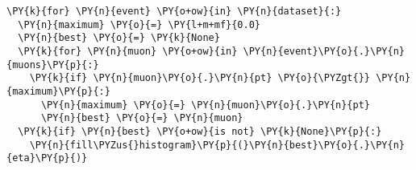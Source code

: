 \begin{Verbatim}[commandchars=\\\{\}]
\PY{k}{for} \PY{n}{event} \PY{o+ow}{in} \PY{n}{dataset}{:}
  \PY{n}{maximum} \PY{o}{=} \PY{l+m+mf}{0.0}
  \PY{n}{best} \PY{o}{=} \PY{k}{None}
  \PY{k}{for} \PY{n}{muon} \PY{o+ow}{in} \PY{n}{event}\PY{o}{.}\PY{n}{muons}\PY{p}{:}
    \PY{k}{if} \PY{n}{muon}\PY{o}{.}\PY{n}{pt} \PY{o}{\PYZgt{}} \PY{n}{maximum}\PY{p}{:}
      \PY{n}{maximum} \PY{o}{=} \PY{n}{muon}\PY{o}{.}\PY{n}{pt}
      \PY{n}{best} \PY{o}{=} \PY{n}{muon}
  \PY{k}{if} \PY{n}{best} \PY{o+ow}{is not} \PY{k}{None}\PY{p}{:}
    \PY{n}{fill\PYZus{}histogram}\PY{p}{(}\PY{n}{best}\PY{o}{.}\PY{n}{eta}\PY{p}{)}
\end{Verbatim}
